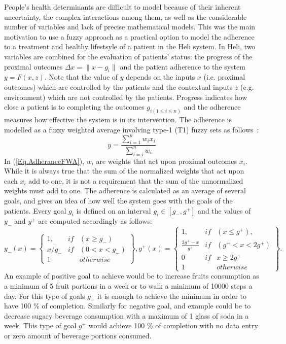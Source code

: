 \documentclass{llncs}
\begin{document}
People's health determinants are difficult to model because of their inherent uncertainty, the complex interactions among them, as well as the considerable number of variables and lack of precise mathematical models. This was the main motivation to use a fuzzy approach as a  practical option to model the adherence to a treatment and healthy lifestsyle of a patient in the Heli system. In Heli, two variables are combined for the evaluation of patients' status: the progress of the proximal outcomes $\Delta x = \|x - g_i\|$  and the patient adherence to the system $y = F(x,z)$. Note that the value of $y$ depends on the inputs $x$ (i.e. proximal outcomes) which are controlled by the patients and the contextual inputs $z$ (e.g. environment) which are not controlled by the patients. Progress indicates how close a patient is to completing the outcomes $g_{i(1\leq i \leq n)}$ and the adherence measures how effective the system is in its intervention. The adherence is modelled as a fuzzy weighted average involving type-1 (T1) fuzzy sets as follows~\cite{Liu2008}:
\begin{equation}
y = \frac{\sum_{i=1}^n w_i x_i}{\sum_{i=i}^n w_i}
\label{Eq.AdheranceFWA}
\end{equation}
In (\ref{Eq.AdheranceFWA}), $w_i$ are weights that act upon proximal outcomes $x_i$. While it is always true that the sum of the normalized weights that act upon each $x_i$ add to one, it is not a requirement that the sum of the unnormalized weights must add to one. The adherence is calculated as an average of several goals, and gives an idea of how well the system goes with the goals of the patients. Every goal $g_i$ is defined on an interval $g_i \in [g_{-}, g^{+}]$ and the values of $y_{-}$ and $y^{+}$ are computed accordingly as follows:
\begin{equation}
 	y_{-}(x)= \left\{ 
	\begin{array}{lcr}
        1,	         & if &(x \geq g_{-})\\
        x/g_{-} 	 & if &(0<x<g_{-})\\
        1                & &otherwise
	\end{array}
	\right \},
 	y^{+}(x)= \left\{ 
	\begin{array}{lcr}
        1,	         & if &(x \leq g^{+}),\\
        \frac{2g^{+}- x}{g^{+} }	 & if &(g^{+}<x<2g^{+} )\\
        0                & if & x \geq 2g^{+}\\
        1                & & otherwise
	\end{array}
	\right \}.
\label{Eq.Adherance}
\end{equation}
An example of positive goal to achieve would be to increase fruits consumption as a minimum of 5 fruit portions in a week or to walk a minimum of 10000 steps a day. For this type of goals  $g_{-}$ it is enough to achieve the minimum in order to have 100 \% of completion. Similarly for negative goal, and example could be to decrease sugary beverage consumption with a maximum of 1 glass of soda in a week.  This type of goal $g^{+}$ would achieve 100  \% of completion with no data entry or zero amount of beverage portions consumed.
\end{document}
